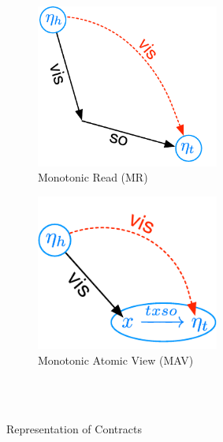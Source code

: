 \begin{figure}
    \centering
    \begin{subfigure}[b]{0.3\textwidth}
        \includegraphics[width=0.66\textwidth]{../Figures/MR.pdf}
        \caption{Monotonic Read (MR)}
        \label{fig:MR}
    \end{subfigure} 
    \hspace{10 mm}
    \begin{subfigure}[b]{0.3\textwidth}
        \centering
        \includegraphics[width=0.66\textwidth]{../Figures/MAV.pdf}
        \caption{Monotonic Atomic View (MAV)}
        \label{fig:MAV}
    \end{subfigure}
    \\ \hrulefill \\
    \caption{Representation of Contracts}\label{fig:contracts}
\end{figure}
